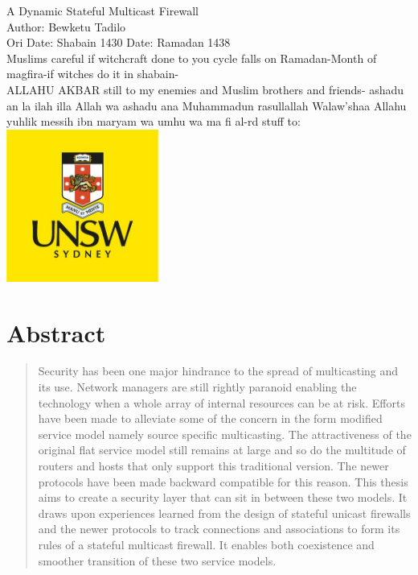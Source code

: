 \documentclass[11pt,left=2cm,bottom=2cm,oneside]{book}
\begin{document}
\pagenumbering{}
\begin{titlepage}
\nopagebreak
\centering
{\LARGE A Dynamic Stateful Multicast Firewall}\\
\vspace*{2cm}
{\Large Author: Bewketu Tadilo}\\
\vspace*{2cm}
{\Large Ori Date: Shabain 1430}
{\Large Date: Ramadan 1438}\\
{Muslims careful if witchcraft done to you cycle falls on Ramadan-Month of magfira-if witches do it in shabain-}\\ 
{\Large ALLAHU AKBAR still to my enemies and Muslim brothers and friends- ashadu an la ilah illa Allah wa ashadu ana Muhammadun rasullallah
Walaw'shaa Allahu yuhlik messih ibn maryam wa umhu wa ma fi al-rd
}
\vspace{2cm}
{\hspace{-3cm}\Large stuff to:}\\
\vspace{5.83cm}
\includegraphics[height=5cm]{unsw-logo.jpg}
\end{titlepage}

 \section*{\centering Abstract}
\begin{quotation}
Security has been one major hindrance to the spread of multicasting and its use. Network managers are still rightly paranoid
enabling the technology when a whole array of internal resources
can be at risk. Efforts have been made to alleviate some of the
concern in the form modified service model namely source specific
multicasting. The attractiveness of the original flat service model
still remains at large and so do the multitude of routers and hosts
that only support this traditional version. The newer protocols
have been made backward compatible for this reason. This thesis aims to create a security layer that can sit in between these
two models. It draws upon experiences learned from the design
of stateful unicast firewalls and the newer protocols to track connections and associations to form its rules of a stateful multicast
firewall. It enables both coexistence and smoother transition of
these two service models.
\end{quotation}
\clearpage
\vspace*{8cm}
\end{document}
